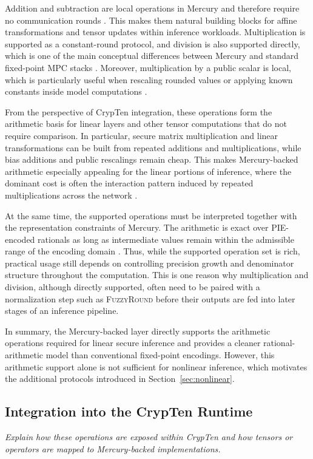 Addition and subtraction are local operations in Mercury and therefore require no communication rounds \cite{mercury-paper}. %
This makes them natural building blocks for affine transformations and tensor updates within inference workloads. 
Multiplication is supported as a constant-round protocol, and division is also supported directly, which is one of the main conceptual differences between Mercury and standard fixed-point MPC stacks \cite{mercury-paper}. %
Moreover, multiplication by a public scalar is local, which is particularly useful when rescaling rounded values or applying known constants inside model computations \cite{mercury-paper}. %

From the perspective of CrypTen integration, these operations form the arithmetic basis for linear layers and other tensor computations that do not require comparison. 
In particular, secure matrix multiplication and linear transformations can be built from repeated additions and multiplications, while bias additions and public rescalings remain cheap. 
This makes Mercury-backed arithmetic especially appealing for the linear portions of inference, where the dominant cost is often the interaction pattern induced by repeated multiplications across the network \cite{crypten-paper,ppml-inference-survey}. %

At the same time, the supported operations must be interpreted together with the representation constraints of Mercury. The arithmetic is exact over PIE-encoded rationals as long as intermediate values remain within the admissible range of the encoding domain \cite{mercury-paper}. %
Thus, while the supported operation set is rich, practical usage still depends on controlling precision growth and denominator structure throughout the computation. 
This is one reason why multiplication and division, although directly supported, often need to be paired with a normalization step such as \textsc{FuzzyRound} before their outputs are fed into later stages of an inference pipeline.

In summary, the Mercury-backed layer directly supports the arithmetic operations required for linear secure inference and provides a cleaner rational-arithmetic model than conventional fixed-point encodings.
However, this arithmetic support alone is not sufficient for nonlinear inference, which motivates the additional protocols introduced in Section~\ref{sec:nonlinear}.

\subsection{Integration into the CrypTen Runtime}
\textit{Explain how these operations are exposed within CrypTen and how tensors or operators are mapped to Mercury-backed implementations.}

